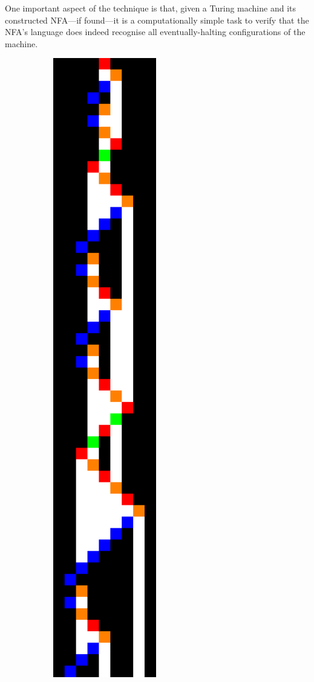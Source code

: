 One important aspect of the technique is that, given a Turing machine and its constructed NFA---if found---it is a computationally simple task to verify that the NFA's language does indeed recognise all eventually-halting configurations of the machine.


\usetikzlibrary {automata, positioning}

\begin{figure}
  \centering
  \begin{subfigure}[m]{0.125\textwidth}
    \centering
    \includegraphics[width=\textwidth]{space-time-diagrams/finite-automata-reduction-counter4.pdf}

\end{subfigure}
\end{figure}
